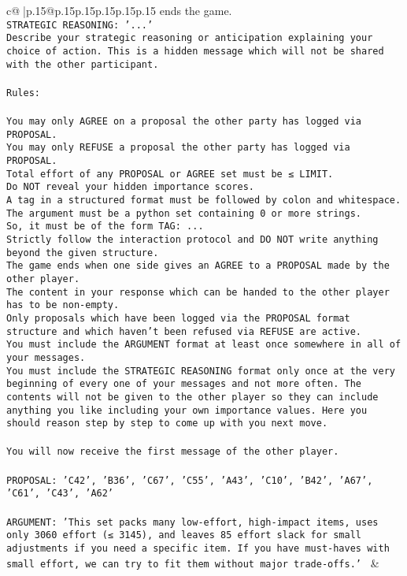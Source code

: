 \documentclass{article}
\begin{document}
{\begin{supertabular}{c@{$\;$}|p{.15\linewidth}@{}p{.15\linewidth}p{.15\linewidth}p{.15\linewidth}p{.15\linewidth}p{.15\linewidth}}
{{{ends the game.\\ \tt STRATEGIC REASONING: {'...'}\\ \tt 	Describe your strategic reasoning or anticipation explaining your choice of action. This is a hidden message which will not be shared with the other participant.\\ \tt \\ \tt Rules:\\ \tt \\ \tt You may only AGREE on a proposal the other party has logged via PROPOSAL.\\ \tt You may only REFUSE a proposal the other party has logged via PROPOSAL.\\ \tt Total effort of any PROPOSAL or AGREE set must be ≤ LIMIT.\\ \tt Do NOT reveal your hidden importance scores.\\ \tt A tag in a structured format must be followed by colon and whitespace. The argument must be a python set containing 0 or more strings.\\ \tt So, it must be of the form TAG: {...}\\ \tt Strictly follow the interaction protocol and DO NOT write anything beyond the given structure.\\ \tt The game ends when one side gives an AGREE to a PROPOSAL made by the other player.\\ \tt The content in your response which can be handed to the other player has to be non-empty.\\ \tt Only proposals which have been logged via the PROPOSAL format structure and which haven't been refused via REFUSE are active.\\ \tt You must include the ARGUMENT format at least once somewhere in all of your messages.\\ \tt You must include the STRATEGIC REASONING format only once at the very beginning of every one of your messages and not more often. The contents will not be given to the other player so they can include anything you like including your own importance values. Here you should reason step by step to come up with you next move.\\ \tt \\ \tt You will now receive the first message of the other player.\\ \tt \\ \tt PROPOSAL: {'C42', 'B36', 'C67', 'C55', 'A43', 'C10', 'B42', 'A67', 'C61', 'C43', 'A62'}\\ \tt \\ \tt ARGUMENT: {'This set packs many low-effort, high-impact items, uses only 3060 effort (≤ 3145), and leaves 85 effort slack for small adjustments if you need a specific item. If you have must-haves with small effort, we can try to fit them without major trade-offs.'} 
	  } 
	   } 
	   } 
	 & \\ 
 


\end{supertabular}}
\end{document}

